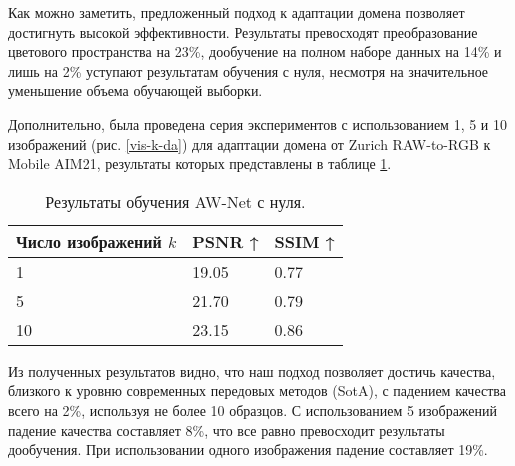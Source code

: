 Как можно заметить, предложенный подход к адаптации домена позволяет достигнуть высокой эффективности. Результаты превосходят преобразование цветового пространства на 23\%, дообучение на полном наборе данных на 14\% и лишь на 2\% уступают результатам обучения с нуля, несмотря на значительное уменьшение объема обучающей выборки.


Дополнительно, была проведена серия экспериментов с использованием 1, 5 и 10 изображений (рис. \ref{vis-k-da}) для адаптации домена от Zurich RAW-to-RGB к Mobile AIM21, результаты которых представлены в таблице \ref{tab:k-da}. 

\begin{table}[H]
    \caption{Результаты обучения AW-Net с нуля.}\label{tab:k-da}
    \begin{tabular}{|p{3cm}|p{3cm}|p{3cm}|}
        \hline
        {Число изображений $k$} & {PSNR ↑} & {SSIM ↑} \\
        \hline
        1 & 19.05 & 0.77 \\
        \hline
        5 & 21.70 & 0.79 \\
        \hline
        10 & 23.15 & 0.86  \\
        \hline
    \end{tabular}
\end{table}

Из полученных результатов видно, что наш подход позволяет достичь качества, близкого к уровню современных передовых методов (SotA), с падением качества всего на 2\%, используя не более 10 образцов. С использованием 5 изображений падение качества составляет 8\%, что все равно превосходит результаты дообучения. При использовании одного изображения падение составляет 19\%.

